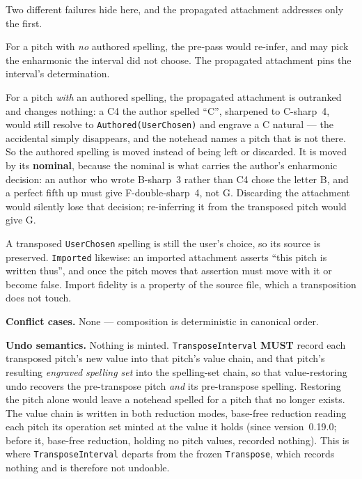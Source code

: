 \documentclass[11pt,letterpaper]{report}
\newcommand{\MUST}{\textbf{MUST}}
\begin{document}
\begin{rationale}
  Two different failures hide here, and the propagated attachment addresses only
  the first.

  For a pitch with \emph{no} authored spelling, the pre-pass would re-infer, and
  may pick the enharmonic the interval did not choose. The propagated attachment
  pins the interval's determination.

  For a pitch \emph{with} an authored spelling, the propagated attachment is
  outranked and changes nothing: a C4 the author spelled ``C'', sharpened to
  C-sharp~4, would still resolve to \texttt{Authored(UserChosen)} and engrave a
  C natural --- the accidental simply disappears, and the notehead names a pitch
  that is not there. So the authored spelling is moved instead of being left or
  discarded. It is moved by its \textbf{nominal}, because the nominal is what
  carries the author's enharmonic decision: an author who wrote B-sharp~3 rather
  than C4 chose the letter B, and a perfect fifth up must give F-double-sharp~4,
  not G. Discarding the attachment would silently lose that decision; re-inferring
  it from the transposed pitch would give G.

  A transposed \texttt{UserChosen} spelling is still the user's choice, so its
  source is preserved. \texttt{Imported} likewise: an imported attachment asserts
  ``this pitch is written thus'', and once the pitch moves that assertion must
  move with it or become false. Import fidelity is a property of the source file,
  which a transposition does not touch.
\end{rationale}

\textbf{Conflict cases.} None --- composition is deterministic in canonical order.

\textbf{Undo semantics.} Nothing is minted. \texttt{TransposeInterval}
\MUST{} record each transposed pitch's new value into that pitch's value chain,
and that pitch's resulting \emph{engraved spelling set} into the spelling-set
chain, so that value-restoring undo recovers the pre-transpose pitch \emph{and}
its pre-transpose spelling. Restoring the pitch alone would leave a notehead
spelled for a pitch that no longer exists. The value chain is written in both
reduction modes, base-free reduction reading each pitch its operation set
minted at the value it holds (since version~0.19.0; before it, base-free
reduction, holding no pitch values, recorded nothing). This is where
\texttt{TransposeInterval} departs from the frozen \texttt{Transpose}, which
records nothing and is therefore not undoable.
\end{document}
